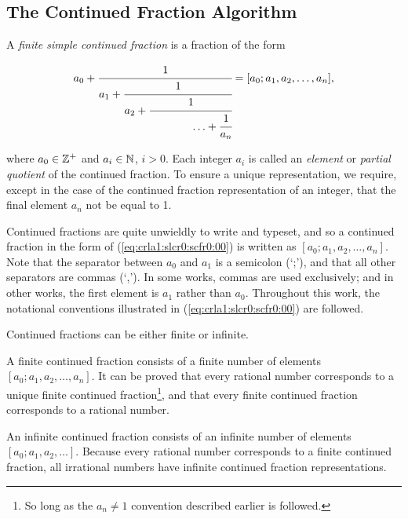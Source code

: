 
\subsection{The Continued Fraction Algorithm}

\label{crla1:slcr0:scfr0}

A \emph{finite simple continued fraction} is a fraction of the form

\begin{equation}
\label{eq:crla1:slcr0:scfr0:00}
a_0 + \cfrac{1}{a_1 + \cfrac{1}{a_2
    + \cfrac{1}{\;\;\;\;\;\;\;\;\;\;\;\;\;\;\ldots + \cfrac{1}{a_n}}}}
    =
    [a_0; a_1, a_2, \ldots , a_n] ,
\end{equation}

\noindent{}where $a_0 \in {\mathbb{Z}^+}$ and 
$a_i \in {\mathbb{N}}$, $i > 0$.  Each integer
$a_i$ is called an \emph{element} or
\emph{partial quotient} 
of the continued fraction.
To ensure a unique representation, we require, except in the case of
the continued fraction representation of an integer,
that the final element $a_n$ not be equal
to 1.

Continued fractions are quite unwieldly to write and typeset,
and so a continued fraction in the form of (\ref{eq:crla1:slcr0:scfr0:00})
is written as $[a_0; a_1, a_2, \ldots , a_n]$.  Note that the
separator between $a_0$ and $a_1$ is a semicolon (`;'), and that all other
separators are commas (`,').  In some works, commas are used exclusively; and in
other works, the first element is $a_1$ rather than $a_0$.  Throughout this
work, the notational conventions illustrated in (\ref{eq:crla1:slcr0:scfr0:00}) are
followed.

Continued fractions can be either finite or infinite.

A finite continued fraction consists of a finite number of elements
$[a_0; a_1, a_2, \ldots , a_n]$.  It can be proved that 
every rational number corresponds to a unique
finite continued fraction\footnote{So long as the $a_n \neq 1$ convention
described earlier is followed.}, and that 
every finite continued fraction corresponds to a rational number. 

An infinite continued fraction consists of an infinite number
of elements $[a_0; a_1, a_2, \ldots]$.  Because every rational number
corresponds to a finite continued fraction, all irrational numbers have
infinite continued fraction representations.


